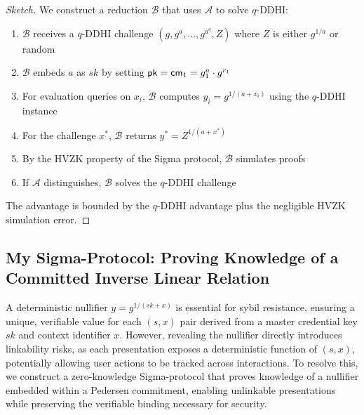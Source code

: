 \begin{proof}[Sketch]
We construct a reduction $\mathcal{B}$ that uses $\mathcal{A}$ to solve $q$-DDHI:
\begin{enumerate}
    \item $\mathcal{B}$ receives a $q$-DDHI challenge $(g, g^a, \ldots, g^{a^q}, Z)$ where $Z$ is either $g^{1/a}$ or random
    \item $\mathcal{B}$ embeds $a$ as $sk$ by setting $\mathsf{pk} = \mathsf{cm}_1 = g_1^a \cdot g^{r_1}$
    \item For evaluation queries on $x_i$, $\mathcal{B}$ computes $y_i = g^{1/(a+x_i)}$ using the $q$-DDHI instance
    \item For the challenge $x^*$, $\mathcal{B}$ returns $y^* = Z^{1/(a+x^*)}$
    \item By the HVZK property of the Sigma protocol, $\mathcal{B}$ simulates proofs
    \item If $\mathcal{A}$ distinguishes, $\mathcal{B}$ solves the $q$-DDHI challenge
\end{enumerate}
The advantage is bounded by the $q$-DDHI advantage plus the negligible HVZK simulation error.
\end{proof}























\subsection{My Sigma-Protocol: Proving Knowledge of a Committed Inverse Linear Relation}\label{chap4:pok_committed_inverse_linear_relation}

A deterministic nullifier $y = g^{1/(sk + x)}$ is essential for sybil resistance, ensuring a unique, verifiable value for each $(s, x)$ pair derived from a master credential key $sk$ and context identifier $x$. However, revealing the nullifier directly introduces linkability risks, as each presentation exposes a deterministic function of $(s, x)$, potentially allowing user actions to be tracked across interactions. To resolve this, we construct a zero-knowledge Sigma-protocol that proves knowledge of a nullifier embedded within a Pedersen commitment, enabling unlinkable presentations while preserving the verifiable binding necessary for security.

